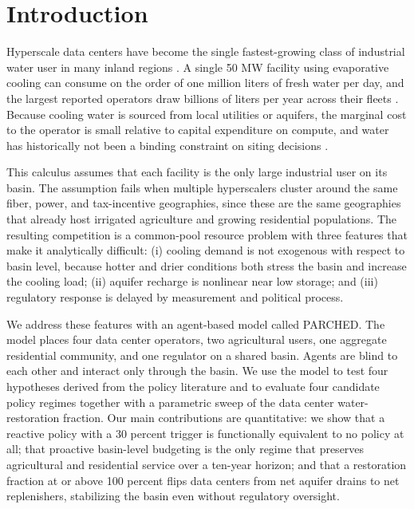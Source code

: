 \documentclass[sigconf,nonacm]{acmart}
\begin{document}

\maketitle

\section{Introduction}

Hyperscale data centers have become the single fastest-growing class of industrial water user in many inland regions \citep{li2023thirsty,google2023environmental}. A single 50 MW facility using evaporative cooling can consume on the order of one million liters of fresh water per day, and the largest reported operators draw billions of liters per year across their fleets \citep{microsoft2022environmental}. Because cooling water is sourced from local utilities or aquifers, the marginal cost to the operator is small relative to capital expenditure on compute, and water has historically not been a binding constraint on siting decisions \citep{shehabi2016usreport,bauer2019hyperscale}.

This calculus assumes that each facility is the only large industrial user on its basin. The assumption fails when multiple hyperscalers cluster around the same fiber, power, and tax-incentive geographies, since these are the same geographies that already host irrigated agriculture and growing residential populations. The resulting competition is a common-pool resource problem with three features that make it analytically difficult: (i) cooling demand is not exogenous with respect to basin level, because hotter and drier conditions both stress the basin and increase the cooling load; (ii) aquifer recharge is nonlinear near low storage; and (iii) regulatory response is delayed by measurement and political process.

We address these features with an agent-based model called PARCHED. The model places four data center operators, two agricultural users, one aggregate residential community, and one regulator on a shared basin. Agents are blind to each other and interact only through the basin. We use the model to test four hypotheses derived from the policy literature and to evaluate four candidate policy regimes together with a parametric sweep of the data center water-restoration fraction. Our main contributions are quantitative: we show that a reactive policy with a 30 percent trigger is functionally equivalent to no policy at all; that proactive basin-level budgeting is the only regime that preserves agricultural and residential service over a ten-year horizon; and that a restoration fraction at or above 100 percent flips data centers from net aquifer drains to net replenishers, stabilizing the basin even without regulatory oversight.
\end{document}
